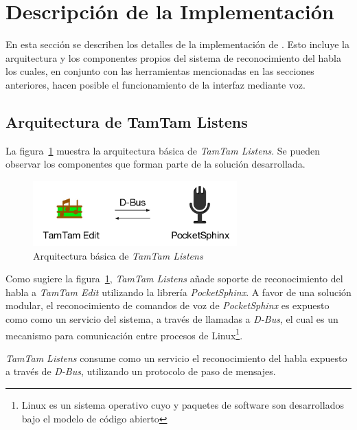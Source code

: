 \section{Descripci\'on de la Implementaci\'on}
\label{sec:descripcion-implementacion}

En esta secci\'on se describen los detalles de la implementaci\'on de .
Esto incluye la arquitectura y los componentes propios del sistema de reconocimiento del habla
los cuales, en conjunto con las herramientas mencionadas en las secciones anteriores, hacen posible
el funcionamiento de la interfaz mediante voz. 

\subsection{Arquitectura de TamTam Listens}
\label{sec:arquitectura-solucion}

La figura~\ref{figure:tamtam-listens-arq} muestra la arquitectura b\'asica de \emph{TamTam Listens}. Se 
pueden observar los componentes que forman parte de la soluci\'on desarrollada.

\begin{figure}[H] 
\centering
\includegraphics[width=0.7\textwidth]{./graphics/tamtam-listens-arq.png}
\caption{Arquitectura b\'asica de \emph{TamTam Listens}}
\label{figure:tamtam-listens-arq}
\end{figure}

Como sugiere la figura~\ref{figure:tamtam-listens-arq}, \emph{TamTam Listens} a\~nade soporte 
de reconocimiento del habla a \emph{TamTam Edit} utilizando la librer\'ia \emph{PocketSphinx}.
A favor de una soluci\'on modular, el reconocimiento de comandos de voz de \emph{PocketSphinx} 
es expuesto como como un  servicio del sistema, a trav\'es de llamadas a \emph{D-Bus}\cite{Dbus2013},
el cual es un mecanismo para comunicaci\'on entre procesos de Linux\footnote{Linux es un sistema operativo
cuyo  y paquetes de software son desarrollados bajo el modelo de c\'odigo abierto\cite{LinuxGuideCert}}.

\emph{TamTam Listens} consume como un servicio el reconocimiento del habla expuesto a trav\'es de 
\emph{D-Bus}, utilizando un protocolo de paso de mensajes.

